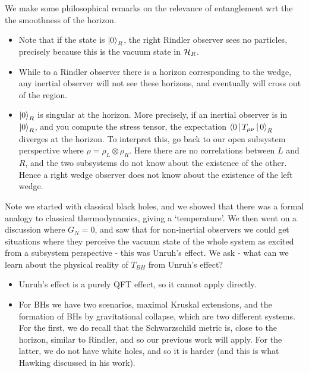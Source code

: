 \documentclass{article}
\begin{document}
\begin{remark}
We make some philosophical remarks on the relevance of entanglement wrt the the smoothness of the horizon.
\begin{itemize}
	\item Note that if the state is $\ket{0}_R$, the right Rindler observer sees no particles, precisely because this is the vacuum state in $\mathcal{H}_R$.
	\item While to a Rindler observer there is a horizon corresponding to the wedge, any inertial observer will not see these horizons, and eventually will cross out of the region. 
	\item $\ket{0}_R$ is singular at the horizon. More precisely, if an inertial observer is in $\ket{0}_R$, and you compute the stress tensor, the expectation $\left\langle 0 \, | \, T_{\mu \nu} \, | \, 0 \right\rangle_R$ diverges at the horizon. To interpret this, go back to our open subsystem perspective where $\rho = \rho_L \otimes \rho_R$. Here there are no correlations between $L$ and $R$, and the two subsystems do not know about the existence of the other. Hence a right wedge observer does not know about the existence of the left wedge.  
\end{itemize}
\end{remark}
\begin{remark}
	Note we started with classical black holes, and we showed that there was a formal analogy to classical thermodynamics, giving a `temperature'. We then went on a discussion where $G_N=0$, and saw that for non-inertial observers we could get situations where they perceive the vacuum state of the whole system as excited from a subsystem perspective - this was Unruh's effect. We ask - what can we learn about the physical reality of $T_{BH}$ from Unruh's effect?
	\begin{itemize}
		\item Unruh's effect is a purely QFT effect, so it cannot apply directly. 
		\item For BHs we have two scenarios, maximal Kruskal extensions, and the formation of BHs by gravitational collapse, which are two different systems. For the first, we do recall that the Schwarzschild metric is, close to the horizon, similar to Rindler, and so our previous work will apply. For the latter, we do not have white holes, and so it is harder (and this is what Hawking discussed in his work).  
	\end{itemize}
\end{remark}

\end{document}
